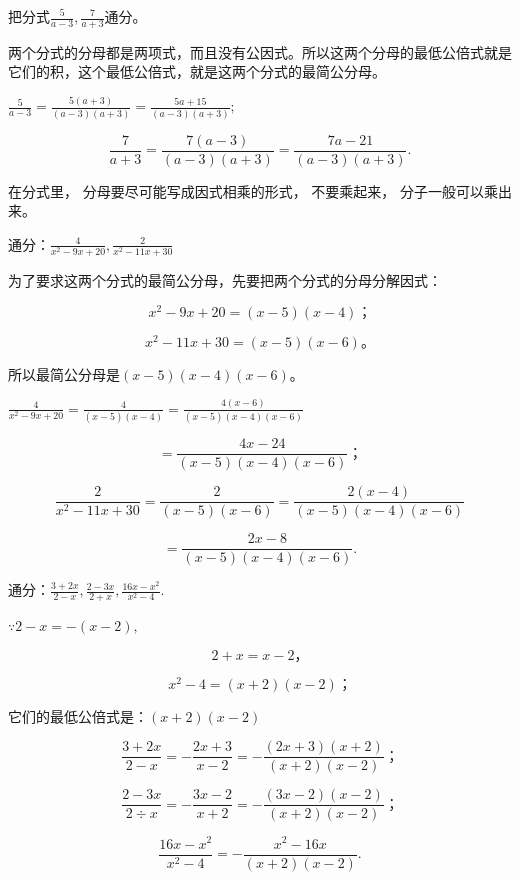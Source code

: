  把分式\(\frac{5}{a - 3}, \frac{7}{a + 3}\)通分。

两个分式的分母都是两项式，而且没有公因式。所以这两个分母的最低公倍式就是它们的积，这个最低公倍式，就是这两个分式的最简公分母。

\(\frac{5}{a - 3} = \frac{5(a + 3)}{(a - 3)(a + 3)} = \frac{5a + 15}{(a - 3)(a + 3)};\)

\[
\frac{7}{a + 3} = \frac{7 (a - 3)}{(a - 3) (a + 3)} = \frac{7 a - 21}{(a - 3) (a + 3)}.
\]

 在分式里， 分母要尽可能写成因式相乘的形式，
不要乘起来， 分子一般可以乘出来。

 通分：\(\frac{4}{x^2 - 9x + 20},\frac{2}{x^2 - 11x + 30}\)

为了要求这两个分式的最简公分母，先要把两个分式的分母分解因式：

\[
x ^{2} - 9 x + 20 = (x - 5) (x - 4)\text{；}
\]

\[
x ^{2} - 11 x + 30 = (x - 5) (x - 6)\text{。}
\]

所以最简公分母是\((x - 5)(x - 4)(x - 6)\)。

\(\frac{4}{x^2 - 9x + 20} = \frac{4}{(x - 5)(x - 4)} = \frac{4(x - 6)}{(x - 5)(x - 4)(x - 6)}\)

\[
= \frac{4 x - 24}{(x - 5) (x - 4) (x - 6)}\text{；}
\]

\[
\frac{2}{x ^{2} - 11 x + 30} = \frac{2}{(x - 5) (x - 6)} = \frac{2 (x - 4)}{(x - 5) (x - 4) (x - 6)}
\]

\[
= \frac{2 x - 8}{(x - 5) (x - 4) (x - 6)}.
\]

通分：\(\frac{3 + 2x}{2 - x},\frac{2 - 3x}{2 + x},\frac{16x - x^2}{x^2 - 4}.\)

\(\because 2 - x = -(x - 2),\)

\[
2 + x = x - 2\text{，}
\]

\[
x ^{2} - 4 = (x + 2) (x - 2)\text{；}
\]

它们的最低公倍式是：\((x + 2)(x - 2)\)


\[
\frac{3 + 2 x}{2 - x} = - \frac{2 x + 3}{x - 2} = - \frac{(2 x + 3) (x + 2)}{(x + 2) (x - 2)}\text{；}
\]

\[
\frac{2 - 3 x}{2 \div x} = - \frac{3 x - 2}{x + 2} = - \frac{(3 x - 2) (x - 2)}{(x + 2) (x - 2)}\text{；}
\]

\[
\frac{16 x - x ^{2}}{x ^{2} - 4} = - \frac{x ^{2} - 16 x}{(x + 2) (x - 2)}.
\]

